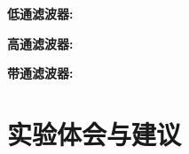 \documentclass{dspreport}
\begin{document}
\noindent\textbf{低通滤波器:}

\begin{block}

\end{block}

\begin{figure}[H]

\end{figure}

\begin{block}

\end{block}

\noindent\textbf{高通滤波器:}

\begin{block}

\end{block}

\begin{figure}[H]

\end{figure}

\begin{block}

\end{block}

\noindent\textbf{带通滤波器:}

\begin{block}

\end{block}

\begin{figure}[H]

\end{figure}

\begin{block}

\end{block}

\section{实验体会与建议}
\begin{block}

\end{block}
\end{document}

